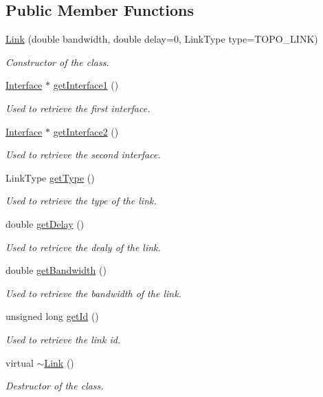 \subsection*{\-Public \-Member \-Functions}
\begin{DoxyCompactItemize}
\item 
\hyperlink{classLink_aa6b6dbcaeaed9e77f11d5ea9e2bf0b9c}{\-Link} (double bandwidth, double delay=0, \-Link\-Type type=\-T\-O\-P\-O\-\_\-\-L\-I\-N\-K)
\begin{DoxyCompactList}\small\item\em \-Constructor of the class. \end{DoxyCompactList}\item 
\hyperlink{classInterface}{\-Interface} $\ast$ \hyperlink{classLink_a569be501deb522349bb98cb7a2c35d7d}{get\-Interface1} ()
\begin{DoxyCompactList}\small\item\em \-Used to retrieve the first interface. \end{DoxyCompactList}\item 
\hyperlink{classInterface}{\-Interface} $\ast$ \hyperlink{classLink_a34121ef74d9707874c657ff17d149723}{get\-Interface2} ()
\begin{DoxyCompactList}\small\item\em \-Used to retrieve the second interface. \end{DoxyCompactList}\item 
\-Link\-Type \hyperlink{classLink_abd3740fe04b6e879f7d7eaa61777c1a4}{get\-Type} ()
\begin{DoxyCompactList}\small\item\em \-Used to retrieve the type of the link. \end{DoxyCompactList}\item 
double \hyperlink{classLink_a60f08e504d5badbc2ca1ddcf9be8f60f}{get\-Delay} ()
\begin{DoxyCompactList}\small\item\em \-Used to retrieve the dealy of the link. \end{DoxyCompactList}\item 
double \hyperlink{classLink_af732993697aeab204a56906f65be9cfb}{get\-Bandwidth} ()
\begin{DoxyCompactList}\small\item\em \-Used to retrieve the bandwidth of the link. \end{DoxyCompactList}\item 
unsigned long \hyperlink{classLink_a41a0d1131848c5df499ebe96ca50915a}{get\-Id} ()
\begin{DoxyCompactList}\small\item\em \-Used to retrieve the link id. \end{DoxyCompactList}\item 
\hypertarget{classLink_a666e442abb3122fe5eb1705f1b2d650d}{virtual \hyperlink{classLink_a666e442abb3122fe5eb1705f1b2d650d}{$\sim$\-Link} ()}\label{classLink_a666e442abb3122fe5eb1705f1b2d650d}

\begin{DoxyCompactList}\small\item\em \-Destructor of the class. \end{DoxyCompactList}\end{DoxyCompactItemize}

